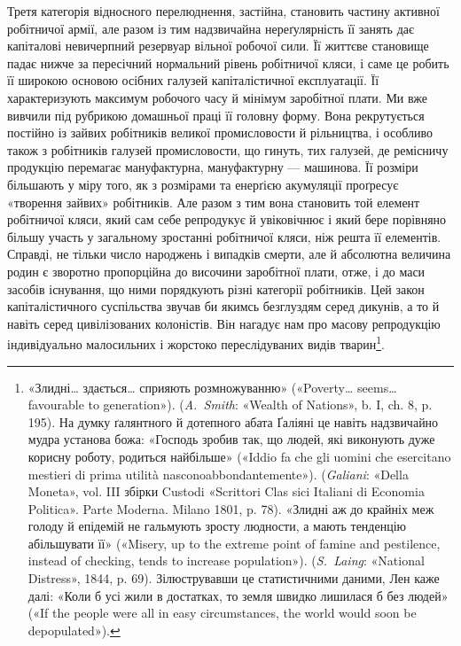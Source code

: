 Третя категорія відносного перелюднення, застійна, становить частину активної робітничої армії, але
разом із тим надзвичайна нереґулярність її занять дає капіталові невичерпний резервуар вільної
робочої сили. Її життєве становище падає нижче за
пересічний нормальний рівень робітничої кляси, і саме це робить її широкою основою осібних галузей
капіталістичної експлуатації. Її характеризують максимум робочого часу й мінімум заробітної плати.
Ми вже вивчили під рубрикою домашньої праці її головну форму. Вона рекрутується постійно із зайвих
робітників великої промисловости й рільництва, і особливо також з робітників галузей промисловости,
що гинуть, тих галузей, де ремісничу продукцію перемагає мануфактурна, мануфактурну — машинова. Її
розміри більшають у міру того, як з розмірами та енерґією акумуляції проґресує «творення зайвих»
робітників. Але разом з тим вона становить той елемент робітничої кляси, який сам себе репродукує й
увіковічнює і який бере порівняно більшу участь у загальному зростанні робітничої кляси, ніж решта
її елементів. Справді, не тільки число народжень і випадків смерти, але й абсолютна величина родин є
зворотно пропорційна до височини заробітної плати, отже, і до маси засобів існування, що ними
порядкують різні категорії робітників. Цей закон капіталістичного суспільства звучав би якимсь
безглуздям серед дикунів, а то й навіть серед цивілізованих колоністів. Він нагадує нам про масову
репродукцію індивідуально малосильних і жорстоко переслідуваних видів тварин\footnote{
«Злидні\dots{} здається\dots{} сприяють розмножуванню» («Poverty\dots{} seems\dots{} favourable to generation»).
(\emph{A.~Smith}: «Wealth of Nations», b. I, ch. 8, p. 195). На думку ґалянтного й дотепного абата Ґаліяні
це навіть надзвичайно мудра установа божа: «Господь зробив так, що людей, які виконують дуже корисну
роботу, родиться найбільше» («Iddio fa che
gli uomini che esercitano mestieri di prima utilità nasconoabbondantemente»). (\emph{Galiani}: «Della
Moneta», vol. III збірки Custodi «Scrittori Clas sici Italiani di Economia Politica». Parte Moderna.
Milano 1801, p. 78). «Злидні аж до крайніх меж голоду й епідемій не гальмують зросту людности, а
мають тенденцію абільшувати її» («Misery, up to the extreme point of famine and pestilence, instead
of checking, tends to increase population»).
(\emph{S.~Laing}: «National Distress», 1844, p. 69). Зілюструвавши це статистичними даними, Лен каже далі:
«Коли б усі жили в достатках, то земля швидко лишилася б без людей» («If the people were all in easy
circumstances, the world would soon be depopulated»).
}.

